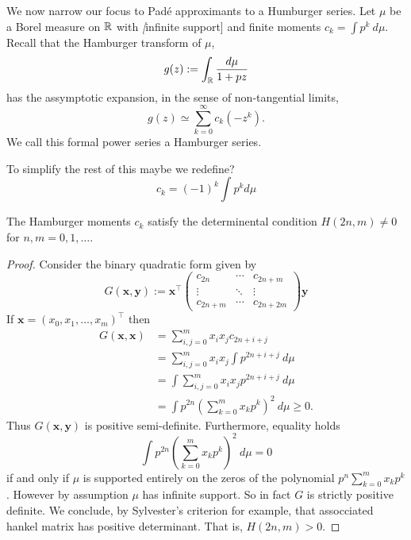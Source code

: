 We now narrow our focus to Pad\'e approximants to a Humburger series. Let $\mu$ be a Borel measure on $\mathbb{R}$ with \emph[infinite support]  and finite moments $c_k = \int p^k ~d\mu$. Recall that the Hamburger transform of $\mu$,
\[
    g(z) := \int_{\mathbb{R}} \frac{d\mu}{1+pz}
\]
has the assymptotic expansion, in the sense of non-tangential limits,
\[
  g(z) \simeq \sum_{k=0}^\infty c_k (-z^k).
\]
We call this formal power series a Hamburger series. 

\begin{remark}
  To simplify the rest of this maybe we redefine?
  \[
    c_k = {(-1)}^k\int p^k d\mu
  \]
\end{remark}

\begin{lemma}
  The Hamburger moments $c_k$ satisfy the determinental condition $H(2n, m) \neq 0$ for $n,m = 0, 1, \ldots$. 
\end{lemma}

\begin{proof}
  Consider the binary quadratic form given by
  \[
    G(\mathbf{x}, \mathbf{y}) :=
    \mathbf{x}^\top
    \begin{pmatrix}
      c_{2n} & \cdots & c_{2n+m} \\
      \vdots & \ddots & \vdots  \\
      c_{2n+m} & \cdots & c_{2n+2m}
    \end{pmatrix}
    \mathbf{y}
  \]
  If $\mathbf{x} = {(x_0, x_1, \ldots, x_m)}^\top$ then
  \begin{align*}
    G(\mathbf{x}, \mathbf{x})
    &= \sum_{i,j=0}^m x_i x_j c_{2n+i+j} \\
    &= \sum_{i,j=0}^m x_i x_j \int p^{2n+i+j} ~d\mu \\
    &= \int \sum_{i,j=0}^m x_i x_j p^{2n+i+j} ~d\mu \\
    &= \int p^{2n} {\left(\sum_{k=0}^m x_k p^{k}\right)}^2 ~d\mu 
    \geq 0.
  \end{align*}
  Thus $G(\mathbf{x}, \mathbf{y})$ is positive semi-definite. Furthermore, equality holds
  \[
    \int p^{2n}{\left(\sum_{k=0}^m x_k p^{k}\right)}^2 ~d\mu = 0
  \]
  if and only if $\mu$ is supported entirely on the zeros of the polynomial $p^n\sum_{k=0}^m x_k p^{k}$. However by assumption $\mu$ has infinite support. So in fact $G$ is strictly positive definite. We conclude, by Sylvester's criterion for example, that assocciated hankel matrix has positive determinant. That is, $H(2n, m) > 0$.
\end{proof}

